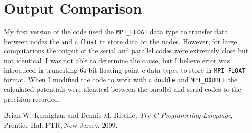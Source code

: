 \documentclass{article}
\begin{document}
\section{Output Comparison}
\label{outputcomp}
My first version of the code used the \verb!MPI_FLOAT! data type to transfer data between nodes the and c \verb!float! to store data on the nodes. However, for large computations the output of the serial and parallel codes were extremely close but not identical. I was not able to determine the cause, but I believe error was introduced in truncating 64 bit floating point c data types to store in \verb!MPI_FLOAT! format. When I modified the code to work with c \verb!double! and \verb!MPI_DOUBLE! the calculated potentials were identical between the parallel and serial codes to the precision recorded.

\begin{thebibliography}{9}

  Brian W. Kernighan and Dennis M. Ritchie,
  \emph{The C Programming Language},
  Prentice Hall PTR, New Jersey,
  2009.

\end{thebibliography}
\end{document}
